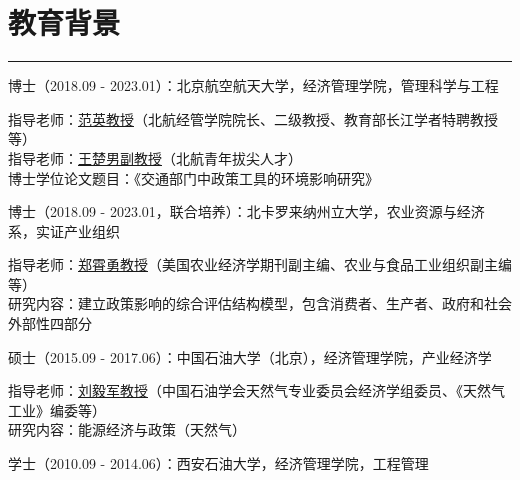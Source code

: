\documentclass[letterpaper]{article}
\renewenvironment{itemize}{
  \begin{list}{}{
    \setlength{\leftmargin}{0.2in}
    \setlength{\itemsep}{0.15in}
    \setlength{\parskip}{0.05in}
    \setlength{\parsep}{0.05in}
  }
}{
  \end{list}
}
\begin{document}
\section*{教育背景}
\hrule
\vspace{0.25cm}
  \begin{itemize}
    \item 博士（2018.09 - 2023.01）：北京航空航天大学，经济管理学院，管理科学与工程
      \begin{itemize}
        \item 指导老师：\href{http://sem.buaa.edu.cn/szdw/yyjjx/fy/jbxx.htm}{范英教授}（北航经管学院院长、二级教授、教育部长江学者特聘教授等）\\
        指导老师：\href{https://shi.buaa.edu.cn/wangbuaa08/zh_CN/index.htm}{王楚男副教授}（北航青年拔尖人才）\\
        博士学位论文题目：《交通部门中政策工具的环境影响研究》
      \end{itemize}
    \item 博士（2018.09 - 2023.01，联合培养）：北卡罗来纳州立大学，农业资源与经济系，实证产业组织
      \begin{itemize}
        \item 指导老师：\href{https://cals.ncsu.edu/agricultural-and-resource-economics/people/xiaoyong-zheng/}{郑霄勇教授}（美国农业经济学期刊副主编、农业与食品工业组织副主编等）\\
        研究内容：建立政策影响的综合评估结构模型，包含消费者、生产者、政府和社会外部性四部分
      \end{itemize}
    \item 硕士（2015.09 - 2017.06）：中国石油大学（北京），经济管理学院，产业经济学
      \begin{itemize}
        \item 指导老师：\href{https://www.cup.edu.cn/sba/szdwgb/yyjjxgb/l2/177732.htm}{刘毅军教授}（中国石油学会天然气专业委员会经济学组委员、《天然气工业》编委等）\\
        研究内容：能源经济与政策（天然气）
      \end{itemize}
    \item 学士（2010.09 - 2014.06）：西安石油大学，经济管理学院，工程管理
  \end{itemize}
\end{document}
